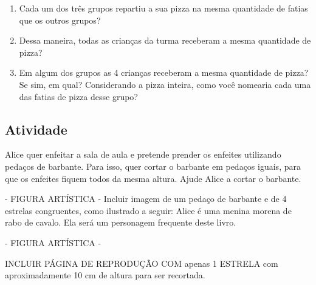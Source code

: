 \documentclass[a4,12pt]{book}
\begin{document}
\begin{enumerate} [\quad a)] %
  \item     Cada um dos três grupos repartiu a sua pizza na mesma quantidade de fatias que os outros grupos?
  \item     Dessa maneira, todas as crianças da turma receberam a mesma quantidade de pizza?
  \item     Em algum dos grupos as 4 crianças receberam a mesma quantidade de pizza? Se sim, em qual? Considerando a pizza inteira, como você nomearia cada uma das fatias de pizza desse grupo? 
\end{enumerate} %







\subsection{Atividade}







Alice quer enfeitar a sala de aula e pretende prender os enfeites utilizando pedaços de barbante. Para isso, quer cortar o barbante em pedaços iguais, para que os enfeites fiquem todos da mesma altura. Ajude Alice a cortar o barbante.

\begin{imagem*}[breakable]{}{}    - FIGURA ARTÍSTICA - Incluir imagem de um pedaço de barbante e de 4 estrelas congruentes, como ilustrado a seguir:  
  Alice é uma menina morena de rabo de cavalo. Ela será um personagem frequente deste livro.  
  
\end{imagem*}

\begin{imagem*}[breakable]{}{}   - FIGURA ARTÍSTICA -  
  \begin{nota*}[breakable]{}{}         
    INCLUIR PÁGINA DE REPRODUÇÃO COM apenas 1 ESTRELA com aproximadamente 10 cm de altura para ser recortada.    
  \end{nota*}  
\end{imagem*}
\end{document}
